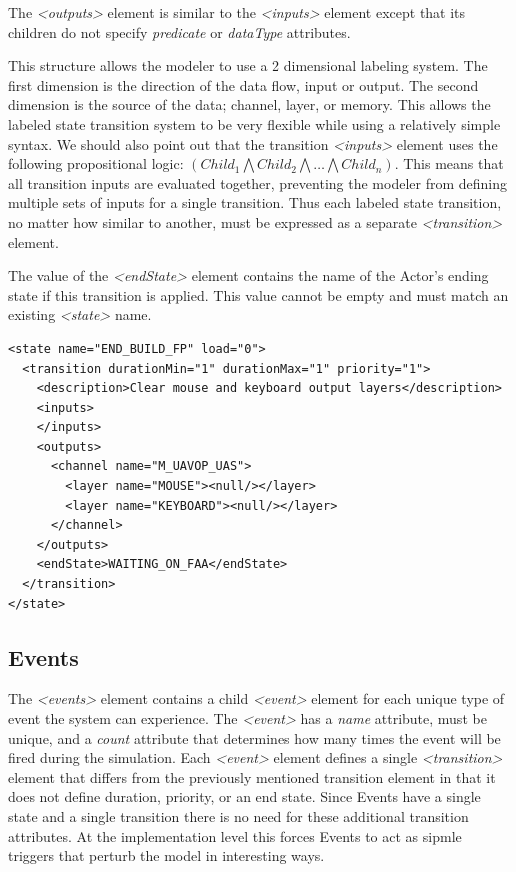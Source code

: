The {\em \textless outputs\textgreater} element is similar to the {\em \textless inputs\textgreater} element except that its children do not specify {\em predicate} or {\em dataType} attributes.  

This structure allows the modeler to use a 2 dimensional labeling system.  The first dimension is the direction of the data flow, input or output.  The second dimension is the source of the data; channel, layer, or memory.  This allows the labeled state transition system to be very flexible while using a relatively simple syntax.  We should also point out that the transition {\em \textless inputs\textgreater} element uses the following propositional logic: $(Child_{1} \bigwedge Child_{2} \bigwedge \ldots \bigwedge Child_{n})$.  This means that all transition inputs are evaluated together, preventing the modeler from defining multiple sets of inputs for a single transition.  Thus each labeled state transition, no matter how similar to another, must be expressed as a separate {\em \textless transition\textgreater} element.

The value of the {\em \textless endState\textgreater} element contains the name of the Actor's ending state if this transition is applied.  This value cannot be empty and must match an existing {\em \textless state\textgreater} name.

\begin{lstlisting}[frame=single]
<state name="END_BUILD_FP" load="0">
  <transition durationMin="1" durationMax="1" priority="1">
    <description>Clear mouse and keyboard output layers</description>
    <inputs>
    </inputs>
    <outputs>
      <channel name="M_UAVOP_UAS">
        <layer name="MOUSE"><null/></layer>
        <layer name="KEYBOARD"><null/></layer>
      </channel>
    </outputs>
    <endState>WAITING_ON_FAA</endState>
  </transition>
</state>
\end{lstlisting}


\subsection{Events}

The {\em \textless events\textgreater} element contains a child {\em \textless event\textgreater} element for each unique type of event the system can experience.  The {\em \textless event\textgreater} has a {\em name} attribute, must be unique, and a {\em count} attribute that determines how many times the event will be fired during the simulation.  Each {\em \textless event\textgreater} element defines a single {\em \textless transition\textgreater} element that differs from the previously mentioned transition element in that it does not define duration, priority, or an end state.  Since Events have a single state and a single transition there is no need for these additional transition attributes.  At the implementation level this forces Events to act as sipmle triggers that perturb the model in interesting ways.


